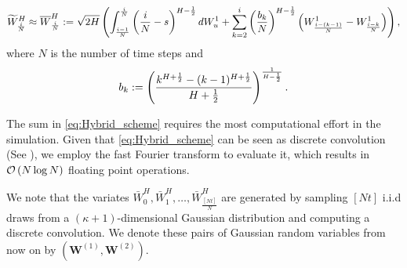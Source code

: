 \begin{equation}\label{eq:Hybrid_scheme}
\widetilde{W}^H_{\frac{i}{N}} \approx \overline{W}^H_{\frac{i}{N}}:= \sqrt{2H} \left(\int_{\frac{i-1}{N}}^{\frac{i}{N}} \left(\frac{i}{N} -s\right)^{H-\frac{1}{2}} dW_u^1+\sum_{k=2}^{i} \left(\frac{b_k}{N}\right)^{H-\frac{1}{2}} \left(W_{\frac{i-(k-1)}{N}}^1-W_{\frac{i-k}{N}}^1\right)\right) ,
\end{equation}
where $N$ is the number of time steps and 
$$ b_k:=\left(\frac{k^{H+\frac{1}{2}}-(k-1)^{H+\frac{1}{2} }}{H+\frac{1}{2}}\right)^{\frac{1}{H-\frac{1}{2}}} .$$

The sum in \eqref{eq:Hybrid_scheme} requires the most computational effort in the simulation. Given that \eqref{eq:Hybrid_scheme} can be seen as discrete convolution  (See \cite{bennedsen2017hybrid}), we employ the fast Fourier transform to evaluate it, which results in  ${\mathcal{O}}\left(N \log N\right)$ floating point operations.


We note that the variates $\bar{W}_0^{H},\bar{W}_1^{H},\dots,\bar{W}_{\frac{[Nt]}{N}}^{H}$ are  generated by sampling $[Nt]$ i.i.d draws from a $(\kappa+1)$-dimensional Gaussian distribution and computing a discrete convolution. We denote these pairs  of Gaussian random variables from now on by $(\mathbf{W}^{(1)},\mathbf{W}^{(2)})$.
